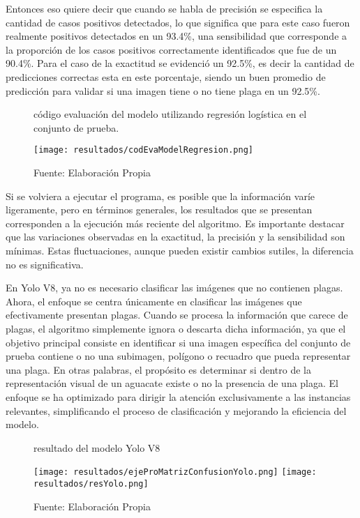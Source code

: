 Entonces eso quiere decir que cuando se habla de precisión se especifica la cantidad de casos positivos detectados, lo que significa que para este caso fueron realmente positivos detectados en un 93.4\%, una sensibilidad que corresponde a la proporción de los casos positivos correctamente identificados que fue de un 90.4\%. Para el caso de la exactitud se evidenció un 92.5\%, es decir la cantidad de predicciones correctas esta en este porcentaje, siendo un buen promedio de predicción para validar si una imagen tiene o no tiene plaga en un 92.5\%.



\begin{figure}[h]
\centering
\caption{código evaluación del modelo utilizando regresión logística en el conjunto de prueba.}
\texttt{[image: resultados/codEvaModelRegresion.png]}
\caption*{\footnotesize Fuente: Elaboración Propia}
\label{fig:figuraCodEvaModelRegresion}
\end{figure}

Si se volviera a ejecutar el programa, es posible que la información varíe ligeramente, pero en términos generales, los resultados que se presentan corresponden a la ejecución más reciente del algoritmo. Es importante destacar que las variaciones observadas en la exactitud, la precisión y la sensibilidad son mínimas. Estas fluctuaciones, aunque pueden existir cambios sutiles, la diferencia no es significativa.

En Yolo V8, ya no es necesario clasificar las imágenes que no contienen plagas. Ahora, el enfoque se centra únicamente en clasificar las imágenes que efectivamente presentan plagas. Cuando se procesa la información que carece de plagas, el algoritmo simplemente ignora o descarta dicha información, ya que el objetivo principal consiste en identificar si una imagen específica del conjunto de prueba contiene o no una subimagen, polígono o recuadro que pueda representar una plaga. En otras palabras, el propósito es determinar si dentro de la representación visual de un aguacate existe o no la presencia de una plaga. El enfoque se ha optimizado para dirigir la atención exclusivamente a las instancias relevantes, simplificando el proceso de clasificación y mejorando la eficiencia del modelo.


\newpage

\begin{figure}[h]
\centering
\caption{resultado del modelo Yolo V8}
\texttt{[image: resultados/ejeProMatrizConfusionYolo.png]}
\texttt{[image: resultados/resYolo.png]}
\caption*{\footnotesize Fuente: Elaboración Propia}
\label{fig:figuraEjeProMatrizConfusion}
\end{figure}


